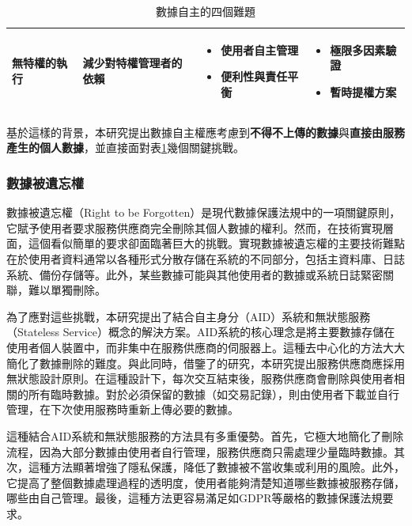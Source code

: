 \begin{table}
\begin{tabular}{>{\raggedright\arraybackslash}p{3cm}>{\raggedright\arraybackslash}p{2.5cm}>{\raggedright\arraybackslash}p{4cm}>{\raggedright\arraybackslash}p{3.5cm}}
    \addlinespace
    無特權的執行                              & 減少對特權管理者的依賴       &
    \begin{itemize}[nosep,leftmargin=*]
      \item 使用者自主管理
      \item 便利性與責任平衡
    \end{itemize} &
    \begin{itemize}[nosep,leftmargin=*]
      \item 極限多因素驗證
      \item 暫時提權方案
    \end{itemize}                                                        \\
    \bottomrule
  \end{tabular}
  \caption{數據自主的四個難題}
  \label{tab:aid-data-difficult}
\end{table}
基於這樣的背景，本研究提出數據自主權應考慮到\textbf{不得不上傳的數據}與\textbf{直接由服務產生的個人數據}，並直接面對表\ref{tab:aid-data-difficult}幾個關鍵挑戰。
\subsubsection{數據被遺忘權}
數據被遺忘權（Right to be Forgotten）是現代數據保護法規中的一項關鍵原則，它賦予使用者要求服務供應商完全刪除其個人數據的權利。然而，在技術實現層面，這個看似簡單的要求卻面臨著巨大的挑戰。實現數據被遺忘權的主要技術難點在於使用者資料通常以各種形式分散存儲在系統的不同部分，包括主資料庫、日誌系統、備份存儲等\cite{smirnova2024understanding}。此外，某些數據可能與其他使用者的數據或系統日誌緊密關聯，難以單獨刪除。

為了應對這些挑戰，本研究提出了結合自主身分（AID）系統和無狀態服務（Stateless Service）概念的解決方案。AID系統的核心理念是將主要數據存儲在使用者個人裝置中，而非集中在服務供應商的伺服器上。這種去中心化的方法大大簡化了數據刪除的難度。與此同時，借鑒了\cite{krstic2023cloud_encryption}的研究，本研究提出服務供應商應採用無狀態設計原則。在這種設計下，每次交互結束後，服務供應商會刪除與使用者相關的所有臨時數據。對於必須保留的數據（如交易記錄），則由使用者下載並自行管理，在下次使用服務時重新上傳必要的數據。

這種結合AID系統和無狀態服務的方法具有多重優勢。首先，它極大地簡化了刪除流程，因為大部分數據由使用者自行管理，服務供應商只需處理少量臨時數據。其次，這種方法顯著增強了隱私保護，降低了數據被不當收集或利用的風險。此外，它提高了整個數據處理過程的透明度，使用者能夠清楚知道哪些數據被服務存儲，哪些由自己管理。最後，這種方法更容易滿足如GDPR等嚴格的數據保護法規要求。


